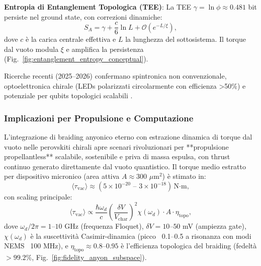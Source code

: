 \documentclass[11pt,a4paper]{article}
\let\oldcite\cite
\renewcommand{\cite}{\protect\oldcite}
\let\oldref\ref
\renewcommand{\ref}{\protect\oldref}
\theoremstyle{plain}
\theoremstyle{definition}
\begin{document}
\vspace{0.3cm}
\textbf{Entropia di Entanglement Topologica (TEE)}: La TEE $\gamma = \ln \phi \approx 0.481$ bit persiste nel ground state, con correzioni dinamiche:
  \begin{equation}
  S_A = \gamma + \frac{c}{6} \ln L + \mathcal{O}(e^{-L/\xi}),
  \label{eq:tee_with_torque}
  \end{equation}
  dove $c$ è la carica centrale effettiva e $L$ la lunghezza del sottosistema. Il torque dal vuoto modula $\xi$ e amplifica la persistenza (Fig.~\ref{fig:entanglement_entropy_conceptual}).

Ricerche recenti (2025--2026) confermano spintronica non convenzionale, optoelettronica chirale (LEDs polarizzati circolarmente con efficienza >50\%) e potenziale per qubits topologici scalabili \cite{jung2024recent, dong2025chirality, pols2025chiral}.

\vspace{0.4cm}

\subsubsection{Implicazioni per Propulsione e Computazione}

L'integrazione di braiding anyonico eterno con estrazione dinamica di torque dal vuoto nelle perovskiti chirali apre scenari rivoluzionari per **propulsione propellantless** scalabile, sostenibile e priva di massa espulsa, con thrust continuo generato direttamente dal vuoto quantistico. Il torque medio estratto per dispositivo micronico (area attiva $A \approx 300$ $\mu$m$^2$) è stimato in:
\begin{equation}
\langle \tau_{\text{vac}} \rangle \approx (5 \times 10^{-20} \text{ -- } 3 \times 10^{-18}) \, \text{N·m},
\label{eq:torque_numerical}
\end{equation}
con scaling principale:
\begin{equation}
\langle \tau_{\text{vac}} \rangle \propto \frac{\hbar \omega_d}{c} \left( \frac{\delta V}{V_{\text{char}}} \right)^2 \chi(\omega_d) \cdot A \cdot \eta_{\text{topo}},
\label{eq:torque_scaling}
\end{equation}
dove $\omega_d / 2\pi = 1$--$10$ GHz (frequenza Floquet), $\delta V = 10$--$50$ mV (ampiezza gate), $\chi(\omega_d)$ è la suscettività Casimir-dinamica (picco ~0.1–0.5 a risonanza con modi NEMS ~100 MHz), e $\eta_{\text{topo}} \approx 0.8$--$0.95$ è l'efficienza topologica del braiding (fedeltà $>99.2\%$, Fig.~\ref{fig:fidelity_anyon_subspace}).
\end{document}
